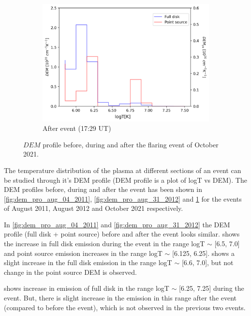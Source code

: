 \begin{figure}[h!]
\begin{subfigure}[b]{0.3\textwidth}
        \includegraphics[width=\textwidth]{images/dem_profile_after_event_2021_oct_28.png}
        \caption{After event (17:29 UT)}
    \end{subfigure}
    \caption[DEM profile for  October 2021 event]{$DEM$ profile before, during and after the flaring event of  October 2021.}
    \label{fig:dem_pro_oct_28_2021}
\end{figure}

The temperature distribution of the plasma at different sections of an event can be studied through it's DEM profile (DEM profile is a plot of logT vs DEM). The DEM profiles before, during and after the event has been shown in \cref{fig:dem_pro_aug_04_2011}, \cref{fig:dem_pro_aug_31_2012} and \cref{fig:dem_pro_oct_28_2021} for the events of  August 2011,  August 2012 and  October 2021 respectively.

In \cref{fig:dem_pro_aug_04_2011} and \cref{fig:dem_pro_aug_31_2012} the DEM profile (full disk + point source) before and after the event looks similar.  shows the increase in full disk emission during the event in the range logT $\sim$ [6.5, 7.0] and point source emission increases in the range logT $\sim$ [6.125, 6.25].  shows a slight increase in the full disk emission in the range logT $\sim$ [6.6, 7.0], but not change in the point source DEM is observed.

 shows increase in emission of full disk in the range logT $\sim$ [6.25, 7.25] during the event. But, there is slight increase in the emission in this range after the event (compared to before the event), which is not observed in the previous two events.

